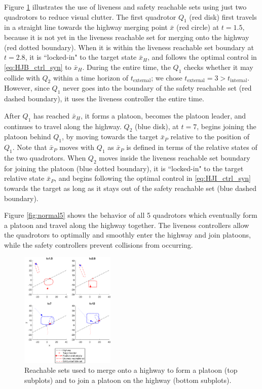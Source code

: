 Figure \ref{fig:normal2} illustrates the use of liveness and safety reachable sets using just two quadrotors to reduce visual clutter. The first quadrotor $Q_1$ (red disk) first travels in a straight line towards the highway merging point $\bar{x}$ (red circle) at $t=1.5$, because it is not yet in the liveness reachable set for merging onto the highway (red dotted boundary). When it is within the liveness reachable set boundary at $t=2.8$, it is ``locked-in" to the target state $\bar{x}_H$, and follows the optimal control in \eqref{eq:HJB_ctrl_syn} to $\bar{x}_H$. During the entire time, the $Q_1$ checks whether it may collide with $Q_2$ within a time horizon of $t_\text{external}$; we chose $t_\text{external}=3>t_\text{internal}$. However, since $Q_1$ never goes into the boundary of the safety reachable set (red dashed boundary), it uses the liveness controller the entire time.

After $Q_1$ has reached $\bar{x}_H$, it forms a platoon, becomes the platoon leader, and continues to travel along the highway. $Q_2$ (blue disk), at $t=7$, begins joining the platoon behind $Q_1$, by moving towards the target $\bar{x}_P$ relative to the position of $Q_1$. Note that $\bar{x}_P$ moves with $Q_1$ as $\bar{x}_P$ is defined in terms of the relative states of the two quadrotors. When $Q_2$ moves inside the liveness reachable set boundary for joining the platoon (blue dotted boundary), it is ``locked-in" to the target relative state $\bar{x}_P$, and begins following the optimal control in \eqref{eq:HJI_ctrl_syn} towards the target as long as it stays out of the safety reachable set (blue dashed boundary).

Figure \ref{fig:normal5} shows the behavior of all 5 quadrotors which eventually form a platoon and travel along the highway together. The liveness controllers allow the quadrotors to optimally and smoothly enter the highway and join platoons, while the safety controllers prevent collisions from occurring.

\begin{figure}
	\centering
	\includegraphics[width=0.4\textwidth]{"normal2"}
	\caption{Reachable sets used to merge onto a highway to form a platoon (top subplots) and to join a platoon on the highway (bottom subplots).}
	\label{fig:normal2}
\end{figure}

